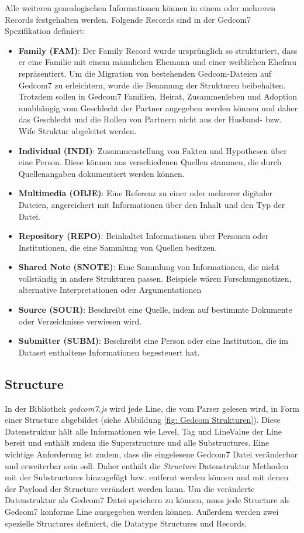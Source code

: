 Alle weiteren genealogischen Informationen können in einem oder mehreren Records festgehalten werden. Folgende Records sind in der Gedcom7 Spezifikation definiert:
\begin{itemize}
\label{liste records}
	\item \textbf{Family (FAM)}: Der Family Record wurde ursprünglich so strukturiert, dass er eine Familie mit einem männlichen Ehemann und einer weiblichen Ehefrau repräsentiert. Um die Migration von bestehenden Gedcom-Dateien auf Gedcom7 zu erleichtern, wurde die Benamung der Strukturen beibehalten. Trotzdem sollen in Gedcom7 Familien, Heirat, Zusammenleben und Adoption unabhängig vom Geschlecht der Partner angegeben werden können und daher das Geschlecht und die Rollen von Partnern nicht aus der Husband- bzw. Wife Struktur abgeleitet werden.
	\item \textbf{Individual (INDI)}: Zusammenstellung von Fakten und Hypothesen über eine Person. Diese können aus verschiedenen Quellen stammen, die durch Quellenangaben dokumentiert werden können.
	\item \textbf{Multimedia (OBJE)}: Eine Referenz zu einer oder mehrerer digitaler Dateien, angereichert mit Informationen über den Inhalt und den Typ der Datei.
	\item \textbf{Repository (REPO)}: Beinhaltet Informationen über Personen oder Institutionen, die eine Sammlung von Quellen besitzen.
	\item \textbf{Shared Note (SNOTE)}: Eine Sammlung von Informationen, die nicht vollständig in andere Strukturen passen. Beispiele wären Forschungsnotizen, alternative Interpretationen oder Argumentationen
	\item \textbf{Source (SOUR)}: Beschreibt eine Quelle, indem auf bestimmte Dokumente oder Verzeichnisse verwiesen wird.
	\item \textbf{Submitter (SUBM)}: Beschreibt eine Person oder eine Institution, die im Dataset enthaltene Informationen begesteuert hat.
\end{itemize}

\subsection{Structure}
\label{subsec: Konzept - Gedcom Strukturen - Structure}
In der Bibliothek \textit{gedcom7.js} wird jede Line, die vom Parser gelesen wird, in Form einer Structure abgebildet (siehe Abbildung \ref{fig: Gedcom Strukturen}). Diese Datenstruktur hält alle Informationen wie Level, Tag und LineValue der Line bereit und enthält zudem die Superstructure und alle Substructures. Eine wichtige Anforderung ist zudem, dass die eingelesene Gedcom7 Datei veränderbar und erweiterbar sein soll. Daher enthält die \textit{Structure} Datenstruktur Methoden mit der Substructures hinzugefügt bzw. entfernt werden können und mit denen der Payload der Structure verändert werden kann. Um die veränderte Datenstruktur als Gedcom7 Datei speichern zu können, muss jede Structure als Gedcom7 konforme Line ausgegeben werden können. Außerdem werden zwei spezielle Structures definiert, die Datatype Structures und Records.



